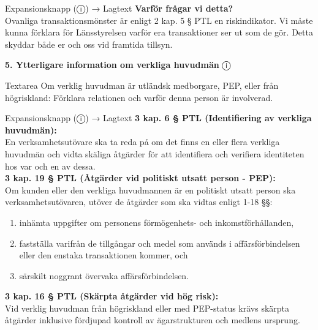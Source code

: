 \documentclass[10pt]{beamer}
\begin{document}
\begin{frame}[label=riskfragor-steg4-fortsattning]
\begin{alertblock}{Expansionsknapp (ⓘ) → Lagtext}
    \tiny \textbf{Varför frågar vi detta?}\\
    \tiny Ovanliga transaktionsmönster är enligt 2 kap. 5 § PTL en riskindikator. Vi måste kunna förklara
    för Länsstyrelsen varför era transaktioner ser ut som de gör. Detta skyddar både er och oss vid framtida tillsyn.
  \end{alertblock}

  \vspace{0.4cm}

  \textbf{5. Ytterligare information om verkliga huvudmän} \hspace{0.3cm} ⓘ\\
  \begin{block}{Textarea}
    \tiny Om verklig huvudman är utländsk medborgare, PEP, eller från högriskland: 
    Förklara relationen och varför denna person är involverad.
  \end{block}
  \begin{alertblock}{Expansionsknapp (ⓘ) → Lagtext}
    \tiny \textbf{3 kap. 6 § PTL (Identifiering av verkliga huvudmän):}\\
    \tiny En verksamhetsutövare ska ta reda på om det finns en eller flera verkliga huvudmän och vidta
    skäliga åtgärder för att identifiera och verifiera identiteten hos var och en av dessa.\\[0.1cm]
    
    \tiny \textbf{3 kap. 19 § PTL (Åtgärder vid politiskt utsatt person - PEP):}\\
    \tiny Om kunden eller den verkliga huvudmannen är en politiskt utsatt person ska verksamhetsutövaren,
    utöver de åtgärder som ska vidtas enligt 1-18 §§:
    \begin{enumerate}
      \item inhämta uppgifter om personens förmögenhets- och inkomstförhållanden,
      \item fastställa varifrån de tillgångar och medel som används i affärsförbindelsen eller den enstaka transaktionen kommer, och
      \item särskilt noggrant övervaka affärsförbindelsen.
    \end{enumerate}
    \vspace{0.1cm}
    
    \tiny \textbf{3 kap. 16 § PTL (Skärpta åtgärder vid hög risk):}\\
    \tiny Vid verklig huvudman från högriskland eller med PEP-status krävs skärpta åtgärder inklusive
    fördjupad kontroll av ägarstrukturen och medlens ursprung.\\[0.1cm]
    

\end{alertblock}
\end{frame}
\end{document}
